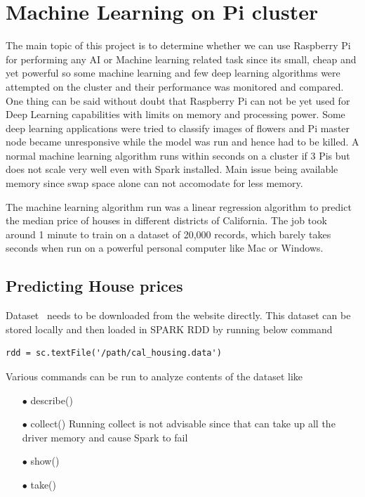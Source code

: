 \section{Machine Learning on Pi cluster}
The main topic of this project is to determine whether we can use Raspberry Pi for performing any AI or Machine learning related task since its small, cheap and yet powerful so some machine learning and few deep learning algorithms were attempted on the cluster and their performance was monitored and compared. One thing can be said without doubt that Raspberry Pi can not be yet used for Deep Learning capabilities with limits on memory and processing power. Some deep learning applications were tried to classify images of flowers and Pi master node became unresponsive while the model was run and hence had to be killed. A normal machine learning algorithm runs within seconds on a cluster if 3 Pis but does not scale very well even with Spark installed. Main issue being available memory since swap space alone can not accomodate for less memory. 

The machine learning algorithm run was a linear regression algorithm to predict the median price of houses in different districts of California. The job took around 1 minute to train on a dataset of 20,000 records, which barely takes seconds when run on a powerful personal computer like Mac or Windows.

\subsection{Predicting House prices }   

Dataset~\cite{hid-sp18-510-dataset} needs to be downloaded from the website directly. This dataset can be stored locally and then loaded in SPARK RDD by running below command

\begin{verbatim}
rdd = sc.textFile('/path/cal_housing.data')
\end{verbatim} 

Various commands can be run to analyze contents of the dataset like 
\begin{itemize}
\item[$\bullet$] describe()
\item[$\bullet$] collect() Running collect is not advisable since that can take up all the driver memory and cause Spark to fail
\item[$\bullet$] show()
\item[$\bullet$] take()
\end{itemize}


